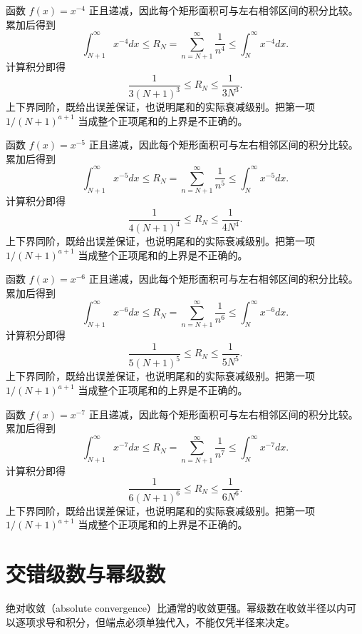 \documentclass[UTF8,12pt,a4paper,fontset=fandol]{ctexart}
\begin{document}
\begin{solve}\label{ans:c25q21}
函数 $f(x)=x^{-4}$ 正且递减，因此每个矩形面积可与左右相邻区间的积分比较。累加后得到
\[
\int_{N+1}^\infty x^{-4}dx\le R_N=\sum_{n=N+1}^\infty\frac1{n^{4}}\le\int_N^\infty x^{-4}dx.
\]
计算积分即得
\[
\frac1{3(N+1)^{3}}\le R_N\le\frac1{3N^{3}}.
\]
上下界同阶，既给出误差保证，也说明尾和的实际衰减级别。把第一项 $1/(N+1)^{a+1}$ 当成整个正项尾和的上界是不正确的。
\end{solve}

\begin{solve}\label{ans:c25q22}
函数 $f(x)=x^{-5}$ 正且递减，因此每个矩形面积可与左右相邻区间的积分比较。累加后得到
\[
\int_{N+1}^\infty x^{-5}dx\le R_N=\sum_{n=N+1}^\infty\frac1{n^{5}}\le\int_N^\infty x^{-5}dx.
\]
计算积分即得
\[
\frac1{4(N+1)^{4}}\le R_N\le\frac1{4N^{4}}.
\]
上下界同阶，既给出误差保证，也说明尾和的实际衰减级别。把第一项 $1/(N+1)^{a+1}$ 当成整个正项尾和的上界是不正确的。
\end{solve}

\begin{solve}\label{ans:c25q23}
函数 $f(x)=x^{-6}$ 正且递减，因此每个矩形面积可与左右相邻区间的积分比较。累加后得到
\[
\int_{N+1}^\infty x^{-6}dx\le R_N=\sum_{n=N+1}^\infty\frac1{n^{6}}\le\int_N^\infty x^{-6}dx.
\]
计算积分即得
\[
\frac1{5(N+1)^{5}}\le R_N\le\frac1{5N^{5}}.
\]
上下界同阶，既给出误差保证，也说明尾和的实际衰减级别。把第一项 $1/(N+1)^{a+1}$ 当成整个正项尾和的上界是不正确的。
\end{solve}

\begin{solve}\label{ans:c25q24}
函数 $f(x)=x^{-7}$ 正且递减，因此每个矩形面积可与左右相邻区间的积分比较。累加后得到
\[
\int_{N+1}^\infty x^{-7}dx\le R_N=\sum_{n=N+1}^\infty\frac1{n^{7}}\le\int_N^\infty x^{-7}dx.
\]
计算积分即得
\[
\frac1{6(N+1)^{6}}\le R_N\le\frac1{6N^{6}}.
\]
上下界同阶，既给出误差保证，也说明尾和的实际衰减级别。把第一项 $1/(N+1)^{a+1}$ 当成整个正项尾和的上界是不正确的。
\end{solve}

\clearpage
\section{交错级数与幂级数}\label{sec:ch26}
绝对收敛（absolute convergence）比通常的收敛更强。幂级数在收敛半径以内可以逐项求导和积分，但端点必须单独代入，不能仅凭半径来决定。
\end{document}
